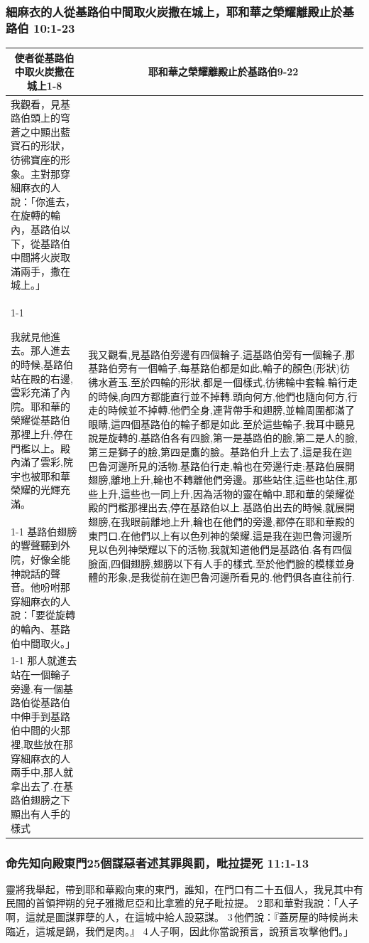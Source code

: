 \subsubsection{細麻衣的人從基路伯中間取火炭撒在城上，耶和華之榮耀離殿止於基路伯 10:1-23}
\begin{table}[H]
\centering
\begin{tabular}{p{6.95cm}|p{10.75cm}}\hline\hline
\multicolumn{1}{c|}{使者從基路伯中取火炭撒在城上1-8}&\multicolumn{1}{c}{耶和華之榮耀離殿止於基路伯9-22}\\\hline
我觀看，見基路伯頭上的穹蒼之中顯出藍寶石的形狀，彷彿寶座的形象。主對那穿細麻衣的人說：「你進去，在旋轉的輪內，基路伯以下，從基路伯中間將火炭取滿兩手，撒在城上。」
&\multirow{4}{11.2cm}{我又觀看,見基路伯旁邊有四個輪子.這基路伯旁有一個輪子,那基路伯旁有一個輪子,每基路伯都是如此,輪子的顏色(形狀)彷彿水蒼玉.至於四輪的形狀,都是一個樣式,彷彿輪中套輪.輪行走的時候,向四方都能直行並不掉轉.頭向何方,他們也隨向何方,行走的時候並不掉轉.他們全身,連背帶手和翅膀,並輪周圍都滿了眼睛,這四個基路伯的輪子都是如此.至於這些輪子,我耳中聽見說是旋轉的.基路伯各有四臉,第一是基路伯的臉,第二是人的臉,第三是獅子的臉,第四是鷹的臉。基路伯升上去了,這是我在迦巴魯河邊所見的活物.基路伯行走,輪也在旁邊行走;基路伯展開翅膀,離地上升,輪也不轉離他們旁邊。那些站住,這些也站住,那些上升,這些也一同上升,因為活物的靈在輪中.耶和華的榮耀從殿的門檻那裡出去,停在基路伯以上.基路伯出去的時候,就展開翅膀,在我眼前離地上升,輪也在他們的旁邊,都停在耶和華殿的東門口.在他們以上有以色列神的榮耀.這是我在迦巴魯河邊所見以色列神榮耀以下的活物,我就知道他們是基路伯.各有四個臉面,四個翅膀,翅膀以下有人手的樣式.至於他們臉的模樣並身體的形象,是我從前在迦巴魯河邊所看見的.他們俱各直往前行.}\\\cline{1-1}

我就見他進去。那人進去的時候,基路伯站在殿的右邊,雲彩充滿了內院。耶和華的榮耀從基路伯那裡上升,停在門檻以上。殿內滿了雲彩,院宇也被耶和華榮耀的光輝充滿。&\\\cline{1-1}
基路伯翅膀的響聲聽到外院，好像全能神說話的聲音。他吩咐那穿細麻衣的人說：「要從旋轉的輪內、基路伯中間取火。」&\\\cline{1-1}
那人就進去站在一個輪子旁邊.有一個基路伯從基路伯中伸手到基路伯中間的火那裡,取些放在那穿細麻衣的人兩手中,那人就拿出去了.在基路伯翅膀之下顯出有人手的樣式&\\\hline
\end{tabular}
\end{table}


\subsubsection{命先知向殿東門25個謀惡者述其罪與罰，毗拉提死 11:1-13}
靈將我舉起，帶到耶和華殿向東的東門，誰知，在門口有二十五個人，我見其中有民間的首領押朔的兒子雅撒尼亞和比拿雅的兒子毗拉提。 2 耶和華對我說：「人子啊，這就是圖謀罪孽的人，在這城中給人設惡謀。 3 他們說：『蓋房屋的時候尚未臨近，這城是鍋，我們是肉。』 4 人子啊，因此你當說預言，說預言攻擊他們。」

